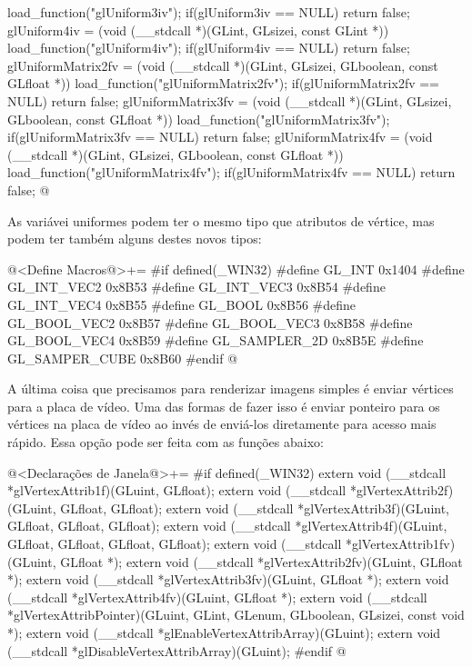                  load_function("glUniform3iv");
if(glUniform3iv == NULL) return false;
glUniform4iv = (void (__stdcall *)(GLint, GLsizei, const GLint *))
                 load_function("glUniform4iv");
if(glUniform4iv == NULL) return false;
glUniformMatrix2fv = (void (__stdcall *)(GLint, GLsizei, GLboolean,
                                         const GLfloat *))
                      load_function("glUniformMatrix2fv");
if(glUniformMatrix2fv == NULL) return false;
glUniformMatrix3fv = (void (__stdcall *)(GLint, GLsizei, GLboolean,
                                         const GLfloat *))
                      load_function("glUniformMatrix3fv");
if(glUniformMatrix3fv == NULL) return false;
glUniformMatrix4fv = (void (__stdcall *)(GLint, GLsizei, GLboolean,
                                         const GLfloat *))
                      load_function("glUniformMatrix4fv");
if(glUniformMatrix4fv == NULL) return false;
@
\fimcodigo

As variávei uniformes podem ter o mesmo tipo que atributos de vértice,
mas podem ter também alguns destes novos tipos:

\iniciocodigo
@<Define Macros@>+=
#if defined(_WIN32)
#define GL_INT         0x1404
#define GL_INT_VEC2    0x8B53
#define GL_INT_VEC3    0x8B54
#define GL_INT_VEC4    0x8B55
#define GL_BOOL        0x8B56
#define GL_BOOL_VEC2   0x8B57
#define GL_BOOL_VEC3   0x8B58
#define GL_BOOL_VEC4   0x8B59
#define GL_SAMPLER_2D  0x8B5E
#define GL_SAMPER_CUBE 0x8B60
#endif
@
\fimcodigo

A última coisa que precisamos para renderizar imagens simples é enviar
vértices para a placa de vídeo. Uma das formas de fazer isso é enviar
ponteiro para os vértices na placa de vídeo ao invés de enviá-los
diretamente para acesso mais rápido. Essa opção pode ser feita com as
funções abaixo:

\iniciocodigo
@<Declarações de Janela@>+=
#if defined(_WIN32)
extern void (__stdcall *glVertexAttrib1f)(GLuint, GLfloat);
extern void (__stdcall *glVertexAttrib2f)(GLuint, GLfloat, GLfloat);
extern void (__stdcall *glVertexAttrib3f)(GLuint, GLfloat, GLfloat, GLfloat);
extern void (__stdcall *glVertexAttrib4f)(GLuint, GLfloat, GLfloat, GLfloat,
                                          GLfloat);
extern void (__stdcall *glVertexAttrib1fv)(GLuint, GLfloat *);
extern void (__stdcall *glVertexAttrib2fv)(GLuint, GLfloat *);
extern void (__stdcall *glVertexAttrib3fv)(GLuint, GLfloat *);
extern void (__stdcall *glVertexAttrib4fv)(GLuint, GLfloat *);
extern void (__stdcall *glVertexAttribPointer)(GLuint, GLint, GLenum, GLboolean,
                                               GLsizei, const void *);
extern void (__stdcall *glEnableVertexAttribArray)(GLuint);
extern void (__stdcall *glDisableVertexAttribArray)(GLuint);
#endif
@
\fimcodigo

